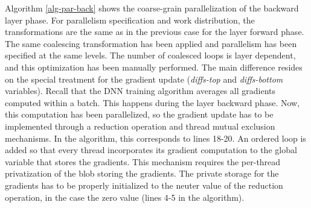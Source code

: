 Algorithm \ref{alg-par-back} shows the coarse-grain parallelization of 
the backward layer phase. For parallelism specification and work 
distribution, the transformations are the same as in the previous 
case for the layer forward phase. The same coalescing transformation has 
been applied and parallelism has been specified at the same levels. 
The number of coalesced loops is layer dependent, and this optimization 
has been manually performed. The main difference resides on the special 
treatment for the gradient update (\emph{diffs-top} and \emph{diffs-bottom} 
variables). Recall that the DNN training algorithm averages all gradients 
computed within a batch. This happens during the layer backward phase.
Now, this computation has been parallelized, so the gradient update has 
to be implemented through a reduction operation and thread mutual exclusion 
mechanisms. In the algorithm, this corresponds to lines 18-20. An ordered loop 
is added so that every thread incorporates its gradient computation to 
the global variable that stores the gradients.
This mechanism requires the per-thread privatization of the blob storing 
the gradients. The private storage for the gradients has to be properly 
initialized to the neuter value of the reduction operation, in the case 
the zero value (lines 4-5 in the algorithm). 




